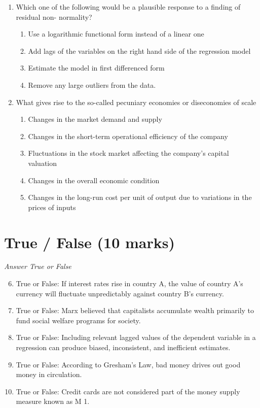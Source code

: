 \documentclass[12pt]{article}
\begin{document}
\begin{enumerate}[label=\arabic*.]
\begin{enumerate}[label=(\alph*)]
\end{enumerate}
\item Which one of the following would be a plausible response to a finding of residual non- normality?
\begin{enumerate}[label=(\alph*)]
    \item Use a logarithmic functional form instead of a linear one
    \item Add lags of the variables on the right hand side of the regression model
    \item Estimate the model in first differenced form
    \item Remove any large outliers from the data.
\end{enumerate}
\item What gives rise to the so-called pecuniary economies or diseconomies of scale
\begin{enumerate}[label=(\alph*)]
    \item Changes in the market demand and supply
    \item Changes in the short-term operational efficiency of the company
    \item Fluctuations in the stock market affecting the company's capital valuation
    \item Changes in the overall economic condition
    \item Changes in the long-run cost per unit of output due to variations in the prices of inputs
\end{enumerate}
\end{enumerate}

\section*{True / False (10 marks)}
\textit{Answer True or False}
\begin{enumerate}[label=\arabic*.]
\setcounter{enumi}{5}
\item True or False: If interest rates rise in country A, the value of country A's currency will fluctuate unpredictably against country B's currency.
\item True or False: Marx believed that capitalists accumulate wealth primarily to fund social welfare programs for society.
\item True or False: Including relevant lagged values of the dependent variable in a regression can produce biased, inconsistent, and inefficient estimates.
\item True or False: According to Gresham's Law, bad money drives out good money in circulation.
\item True or False: Credit cards are not considered part of the money supply measure known as M 1.
\end{enumerate}
\end{document}
